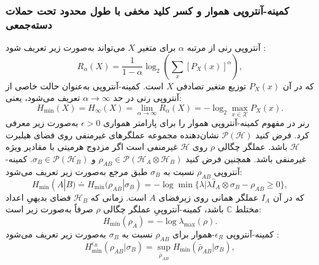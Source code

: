 \subsubsection{کمینه-آنتروپی هموار و کسر کلید مخفی با طول محدود تحت حملات دسته‌جمعی}
\label{subsec:8-2-1-2}
آنتروپی رنی از مرتبه $\alpha$ برای متغیر $X$ می‌تواند به‌صورت زیر تعریف شود \cite{8-34}:
\begin{equation}
	R_\alpha(X) = \frac{1}{1 - \alpha} \log_2 \left( \sum_x [P_X(x)]^\alpha \right),
	\label{eq:8-22}
\end{equation}
که در آن $P_X(x)$ توزیع متغیر تصادفی $X$ است. کمینه-آنتروپی به‌عنوان حالت خاصی از آنتروپی رنی در حد $\alpha \to \infty$ تعریف می‌شود، یعنی:
\begin{equation}
	H_{\min}(X) = H_\infty(X) = \lim_{\alpha \to \infty} R_\alpha(X) = -\log_2 \max_{x \in \mathcal{X}} P_X(x).
	\label{eq:8-23}
\end{equation}
رنر در \cite{8-28} مفهوم کمینه-آنتروپی هموار را برای پارامتر همواری $\epsilon > 0$ به‌صورت زیر معرفی کرد. فرض کنید $\mathcal{P}(\mathcal{H})$ نشان‌دهنده مجموعه عملگرهای غیرمنفی روی فضای هیلبرت $\mathcal{H}$ باشد. عملگر چگالی $\rho$ روی $\mathcal{H}$ غیرمنفی است اگر مزدوج هرمیتی با مقادیر ویژه غیرمنفی باشد. همچنین فرض کنید $\rho_{AB} \in \mathcal{P}(\mathcal{H}_A \otimes \mathcal{H}_B)$ و $\sigma_B \in \mathcal{P}(\mathcal{H}_B)$. کمینه-آنتروپی $\rho_{AB}$ نسبت به $\sigma_B$ طبق مرجع \cite{8-28} به‌صورت زیر تعریف می‌شود:
\begin{equation}
	H_{\min}(A|B) \doteq H_{\min}(\rho_{AB} | \sigma_B) = -\log \min \{ \lambda | \lambda \hat{I}_A \otimes \sigma_B - \rho_{AB} \geq 0 \},
	\label{eq:8-24}
\end{equation}
که در آن $\hat{I}_A$ عملگر همانی روی زیرفضای $A$ است. زمانی که $\mathcal{H}_B$ فضای بدیهیِ اعداد مختلط $\mathbb{C}$ باشد، کمینه-آنتروپیِ عملگر چگالی $\rho$ صرفاً به‌صورت زیر است:
\begin{equation}
	H_{\min}(\rho_A) = -\log \lambda_{\max}(\rho).
	\label{eq:8-25}
\end{equation}
کمینه-آنتروپی $\epsilon_R$-هموار برای $\rho_{AB}$ نسبت به $\sigma_B$ به‌صورت زیر تعریف می‌شود \cite{8-28}:
\begin{equation}
	H_{\min}^{\epsilon_R}(\rho_{AB} | \sigma_B) = \sup_{\bar{\rho}_{AB}} H_{\min}(\bar{\rho}_{AB} | \sigma_B),
	\label{eq:8-26}
\end{equation}
